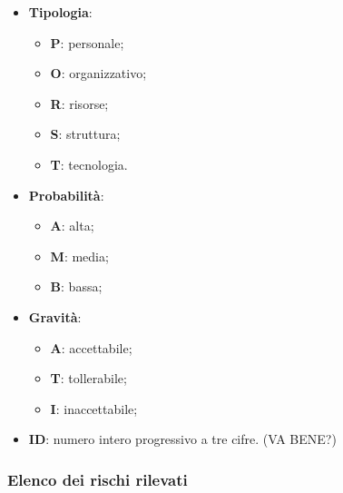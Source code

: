 \begin{itemize}
	\item\textbf{Tipologia}: 
		\begin{itemize}
			\item\textbf{P}: personale;
			\item\textbf{O}: organizzativo;
			\item\textbf{R}: risorse;
			\item\textbf{S}: struttura;
			\item\textbf{T}: tecnologia.		
		\end{itemize}
		
	\item\textbf{Probabilità}: 
		\begin{itemize}
			\item\textbf{A}: alta;
			\item\textbf{M}: media;
			\item\textbf{B}: bassa;
		\end{itemize}
			
	\item\textbf{Gravità}:
		\begin{itemize}
			\item\textbf{A}: accettabile;
			\item\textbf{T}: tollerabile;
			\item\textbf{I}: inaccettabile;		
		\end{itemize}
	
	\item\textbf{ID}: numero intero progressivo a tre cifre. 
	(VA BENE?) 
			
\end{itemize}
		
\subsubsection{Elenco dei rischi rilevati}

